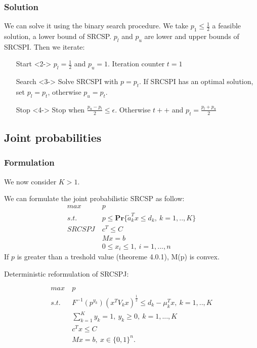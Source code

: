 \documentclass{beamer}
\begin{document}
\subsubsection{Solution}
\begin{frame}
We can solve it using the binary search procedure. We take $p_1 \leq \frac{1}{2}$ a feasible solution, a lower bound of SRCSP. $p_l$ and $p_u$ are lower and upper bounds of SRCSPI. Then we iterate:

\begin{itemize}
\item[Start]<2-> $p_l = \frac{1}{2}$ and $p_u = 1$. Iteration counter $t = 1$
\item[Search]<3-> Solve SRCSPI with $p = p_t$. If SRCSPI has an optimal solution, set $p_l = p_t$, otherwise $p_u = p_t$.
\item[Stop]<4-> Stop when $\frac{p_u - p_l}{2} \leq \epsilon$. Otherwise $t++$ and $p_t = \frac{p_l + p_u}{2} $
\end{itemize}

\end{frame}

\subsection{Joint probabilities}

\subsubsection{Formulation}
\begin{frame}
	We now consider $K > 1$.
	
	We can formulate the joint probabilistic SRCSP as follow:
\begin{align*}
 max\ & p\\
 s.t.\ & p \leq \mathbf{Pr} \{ \tilde{a}_k^Tx \leq d_k ,\ k=1,..,K \} \\
 SRCSPJ \ & c^T \leq C \\
 & Mx = b \\
 & 0 \leq x_i \leq 1, \ i = 1, ..., n
\end{align*}
\pause
If $p$ is greater than a treshold value (theoreme 4.0.1), M(p) is convex.
\end{frame}


\begin{frame}

Deterministic reformulation of SRCSPJ:

\begin{align*}
	max\ & p\\
	s.t.\ & F^{-1}(p^{y_k})(x^TV_kx)^{\frac{1}{2}} \leq d_k - \mu_k^Tx,\ k=1,..,K \\
	& \sum_{k=1}^K{y_k} = 1,\ y_k \geq 0,\ k=1, ..., K \\
	& c^T x \leq C \\
	& Mx = b,\ x \in \{0, 1\}^n.\\
\end{align*}
\end{frame}
\end{document}
